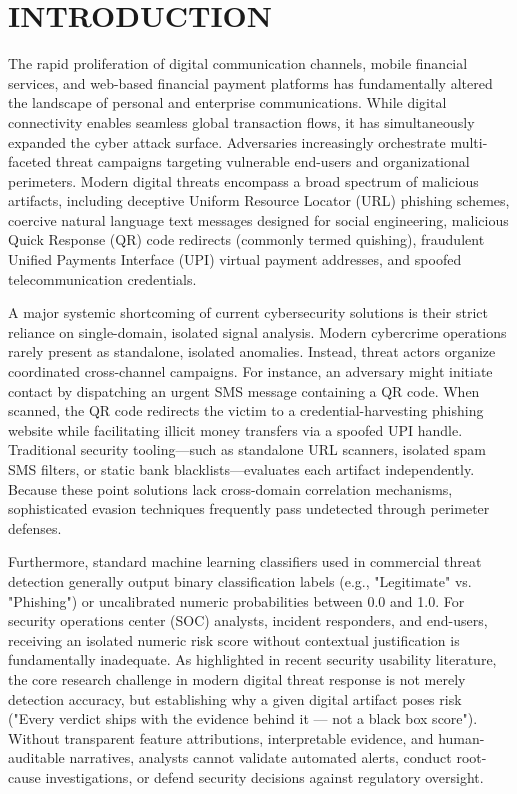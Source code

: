 \documentclass[conference,a4paper]{IEEEtran}
\begin{document}
\section{INTRODUCTION}
The rapid proliferation of digital communication channels, mobile financial services, and web-based financial payment platforms has fundamentally altered the landscape of personal and enterprise communications. While digital connectivity enables seamless global transaction flows, it has simultaneously expanded the cyber attack surface. Adversaries increasingly orchestrate multi-faceted threat campaigns targeting vulnerable end-users and organizational perimeters. Modern digital threats encompass a broad spectrum of malicious artifacts, including deceptive Uniform Resource Locator (URL) phishing schemes, coercive natural language text messages designed for social engineering, malicious Quick Response (QR) code redirects (commonly termed quishing), fraudulent Unified Payments Interface (UPI) virtual payment addresses, and spoofed telecommunication credentials.

A major systemic shortcoming of current cybersecurity solutions is their strict reliance on single-domain, isolated signal analysis. Modern cybercrime operations rarely present as standalone, isolated anomalies. Instead, threat actors organize coordinated cross-channel campaigns. For instance, an adversary might initiate contact by dispatching an urgent SMS message containing a QR code. When scanned, the QR code redirects the victim to a credential-harvesting phishing website while facilitating illicit money transfers via a spoofed UPI handle. Traditional security tooling—such as standalone URL scanners, isolated spam SMS filters, or static bank blacklists—evaluates each artifact independently. Because these point solutions lack cross-domain correlation mechanisms, sophisticated evasion techniques frequently pass undetected through perimeter defenses.

Furthermore, standard machine learning classifiers used in commercial threat detection generally output binary classification labels (e.g., "Legitimate" vs. "Phishing") or uncalibrated numeric probabilities between 0.0 and 1.0. For security operations center (SOC) analysts, incident responders, and end-users, receiving an isolated numeric risk score without contextual justification is fundamentally inadequate. As highlighted in recent security usability literature, the core research challenge in modern digital threat response is not merely detection accuracy, but establishing why a given digital artifact poses risk ("Every verdict ships with the evidence behind it — not a black box score"). Without transparent feature attributions, interpretable evidence, and human-auditable narratives, analysts cannot validate automated alerts, conduct root-cause investigations, or defend security decisions against regulatory oversight.
\end{document}

